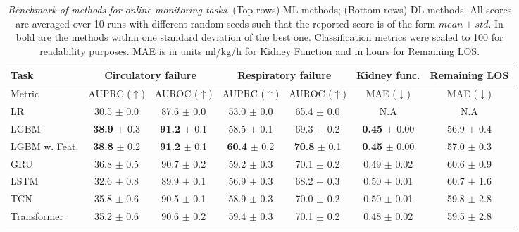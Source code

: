 \documentclass{article}
\begin{document}
\begin{table}[!ht]
    \centering
    \footnotesize
\setlength\tabcolsep{4pt}
\caption{\textit{Benchmark of methods for online monitoring tasks}. (Top rows) ML methods; (Bottom rows) DL methods. All scores are averaged over 10 runs with different random seeds such that the reported score is of the form $mean \pm std$. In bold are the methods within one standard deviation of the best one. Classification metrics were scaled to 100 for readability purposes. MAE is in units ml/kg/h for Kidney Function and in hours for Remaining LOS.}
\begin{tabular}{l|cc|cc||c|c}
\toprule
Task  & \multicolumn{2}{c|}{Circulatory failure} & \multicolumn{2}{c||}{Respiratory failure} &    Kidney func. &       Remaining LOS \\
\midrule
Metric  &      AUPRC ($\uparrow$) & AUROC ($\uparrow$) &  AUPRC ($\uparrow$) & AUROC ($\uparrow$) & MAE ($\downarrow$) &  MAE ($\downarrow$) \\
\midrule
LR                 &          30.5 $\pm$ 0.0 &     87.6 $\pm$ 0.0 &       53.0 $\pm$ 0.0 &      65.4 $\pm$ 0.0 &     N.A &       N.A \\
LGBM               &          \textbf{38.9} $\pm$ 0.3 &     \textbf{91.2} $\pm$ 0.1 &      58.5 $\pm$ 0.1 &     69.3 $\pm$ 0.2 &     \textbf{0.45} $\pm$ 0.00 &   56.9 $\pm$ 0.4 \\
LGBM w. Feat.      &          \textbf{38.8} $\pm$ 0.2 &     \textbf{91.2} $\pm$ 0.1 &      \textbf{60.4} $\pm$ 0.2 &    \textbf{ 70.8} $\pm$ 0.1 &     \textbf{0.45} $\pm$ 0.00 &   57.0 $\pm$ 0.3 \\
\midrule
\midrule
GRU                &         36.8 $\pm$ 0.5 &     90.7 $\pm$ 0.2 &      59.2 $\pm$ 0.3 &     70.1 $\pm$ 0.2 &     0.49 $\pm$ 0.02 &   60.6 $\pm$ 0.9 \\
LSTM               &         32.6 $\pm$ 0.8 &     89.9 $\pm$ 0.1 &      56.9 $\pm$ 0.3 &     68.2 $\pm$ 0.3 &     0.50 $\pm$ 0.01 &  60.7 $\pm$ 1.6 \\
TCN                &         35.8 $\pm$ 0.6 &     90.5 $\pm$ 0.1 &      58.9 $\pm$ 0.3 &     70.0 $\pm$ 0.2 &      0.50 $\pm$ 0.01 &  59.8 $\pm$ 2.8 \\
Transformer        &         35.2 $\pm$ 0.6 &     90.6 $\pm$ 0.2 &      59.4 $\pm$ 0.3 &     70.1 $\pm$ 0.2 &      0.48 $\pm$ 0.02 &       59.5 $\pm$ 2.8 \\
\bottomrule
\end{tabular}
    \label{tab:online-level}
\end{table}
\end{document}
